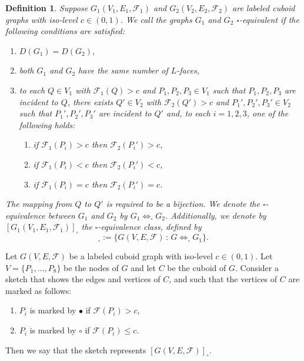 \documentclass[a4paper,11pt]{article}
\newtheorem{definition}[theorem]{Definition}
\begin{document}
\begin{definition}
Suppose $G_1(V_1,E_1,\mathcal{F}_1)$ and $G_2(V_2,E_2,\mathcal{F}_2)$ are labeled cuboid graphs
with iso-level $c\in (0,1)$. We call the graphs $G_1$ and $G_2$ $\square$-equivalent if the following
conditions are satisfied:
\begin{enumerate}
\item[(i)] $D(G_1)=D(G_2)$,
\item[(ii)] both $G_1$ and $G_2$ have the same number of $L$-faces,
\item[(iii)] to each $Q\in V_1$ with $\mathcal{F}_1(Q)>c$ and $P_1,P_2,P_3\in V_1$ such that $P_1, P_2,P_3$ are
incident to $Q$, there exists $Q'\in V_2$ with $\mathcal{F}_2(Q')>c$ and $P_1',P_2',P_3'\in V_2$ such that
$P_1', P_2',P_3'$ are incident to $Q'$ and, to each $i=1,2,3$, one of the following holds:
  \begin{enumerate}
   \item[(a)] if $\mathcal{F}_1(P_i)>c$ then $\mathcal{F}_2(P_i')>c$,
   \item[(b)] if $\mathcal{F}_1(P_i)<c$ then $\mathcal{F}_2(P_i')<c$,
   \item[(c)] if $\mathcal{F}_1(P_i)=c$ then $\mathcal{F}_2(P_i')=c$.
  \end{enumerate}
\end{enumerate}
The mapping from $Q$ to $Q'$ is required to be a bijection. We denote the $\square$-equivalence between $G_1$
and $G_2$ by $G_1\Longleftrightarrow_{\square}G_2$. Additionally, we denote by $[G_1(V_1,E_1,\mathcal{F}_1)]_{\square}$
the $\square$-equivalence class, defined by
\begin{equation}
[G_1(V_1,E_1,\mathcal{F}_1)]_{\square}:=\{G(V,E,\mathcal{F})\,:\,G\Longleftrightarrow_{\square}G_1\}.
\label{eq:equivalence-2}
\end{equation}
\label{def:equivalence-2}
\end{definition}
Let $G(V,E,\mathcal{F})$ be a labeled cuboid
graph with iso-level $c\in (0,1)$. Let $V=\{P_1,\ldots,P_8\}$ be the nodes of $G$ and let  $C$ be the
cuboid of $G$. Consider a sketch that shows the edges and vertices of $C$, and such that the vertices
of $C$ are marked as follows:
\begin{enumerate}
\item[(i)] $P_i$ is marked by $\bullet$ if $\mathcal{F}(P_i)>c$,
\item[(ii)] $P_i$ is marked by $\circ$ if $\mathcal{F}(P_i)\leq c$.
\end{enumerate}
Then we say that the sketch represents $[G(V,E,\mathcal{F})]_{\circ}$.\\
\end{document}
